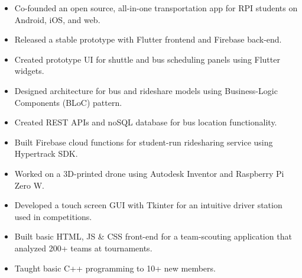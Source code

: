 \documentclass[10pt,a4paper,ragged2e]{altacv}
\begin{document}
\begin{itemize}
\item Co-founded an open source, all-in-one transportation app for RPI students on Android, iOS, and web.
\item Released a stable prototype with Flutter frontend and Firebase back-end.
\item Created prototype UI for shuttle and bus scheduling panels using Flutter widgets.
\item Designed architecture for bus and rideshare models using Business-Logic Components (BLoC) pattern.
\item Created REST APIs and noSQL database for bus location functionality.
\item Built Firebase cloud functions for student-run ridesharing service using Hypertrack SDK.
\end{itemize}

\divider



\begin{itemize}
\item Worked on a 3D-printed drone using Autodesk Inventor and Raspberry Pi Zero W.
\item Developed a touch screen GUI with Tkinter for an intuitive driver station used in competitions.
\item Built basic HTML, JS \& CSS front-end for a team-scouting application that analyzed 200+ teams at tournaments.
\item Taught basic C++ programming to 10+ new members.
\end{itemize}


\clearpage


\nocite{*}


\end{document}
